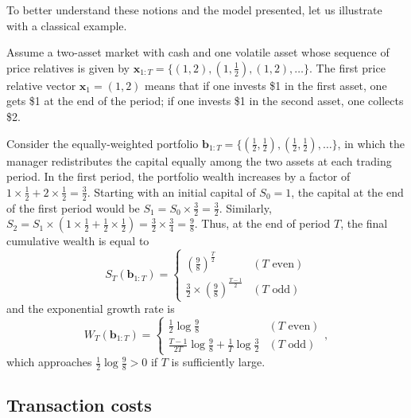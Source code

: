 To better understand these notions and the model presented, let us illustrate with a classical example.
\begin{example}
\label{ex:first-example}
Assume a two-asset market with cash and one volatile asset whose sequence of price relatives is given by $\mathbf{x}_{1:T} = \{(1, 2), (1, \frac{1}{2}), (1, 2), \ldots\}$. The first price relative vector $\mathbf{x}_1 = (1, 2)$ means that if one invests \$1 in the first asset, one gets \$1 at the end of the period; if one invests \$1 in the second asset, one collects \$2.

Consider the equally-weighted portfolio $\mathbf{b}_{1:T} = \{(\frac{1}{2}, \frac{1}{2}), (\frac{1}{2}, \frac{1}{2}), \ldots\}$, in which the manager redistributes the capital equally among the two assets at each trading period. In the first period, the portfolio wealth increases by a factor of $1 \times \frac{1}{2} + 2 \times \frac{1}{2} = \frac{3}{2}$. Starting with an initial capital of $S_0 = 1$, the capital at the end of the first period would be $S_1 = S_0 \times \frac{3}{2} = \frac{3}{2}$. Similarly, $S_2 = S_1 \times (1 \times \frac{1}{2} + \frac{1}{2} \times \frac{1}{2}) = \frac{3}{2} \times \frac{3}{4} = \frac{9}{8}$. Thus, at the end of period $T$, the final cumulative wealth is equal to
\begin{equation}
	S_T(\mathbf{b}_{1:T}) = 
	\begin{cases}
		\left(\frac{9}{8}\right)^\frac{T}{2} & (T \text{ even}) \\
		\frac{3}{2} \times \left(\frac{9}{8}\right)^\frac{T-1}{2} & (T \text{ odd})
	\end{cases}
\end{equation}
and the exponential growth rate is
\begin{equation}
	W_T(\mathbf{b}_{1:T}) = 
	\begin{cases}
		\frac{1}{2}\log\frac{9}{8} & (T \text{ even}) \\
		\frac{T-1}{2T}\log\frac{9}{8} + \frac{1}{T}\log\frac{3}{2} & (T \text{ odd})
	\end{cases},
\end{equation}
which approaches $\frac{1}{2}\log\frac{9}{8} > 0$ if $T$ is sufficiently large.
\end{example}

\subsection{Transaction costs}

